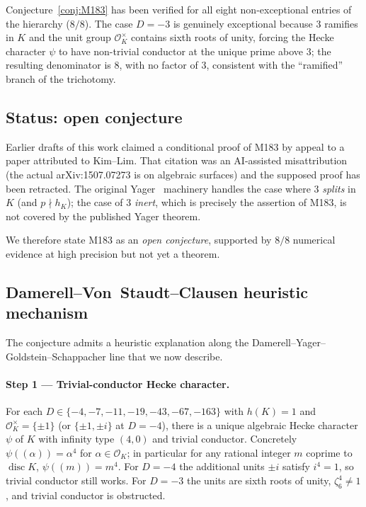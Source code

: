 \documentclass[12pt]{amsart}
\theoremstyle{definition}
\DeclareMathOperator{\disc}{disc}
\newcommand{\OK}{\mathcal{O}_K}
\begin{document}
Conjecture~\ref{conj:M183} has been verified for all eight non-exceptional
entries of the hierarchy ($8/8$). The case $D = -3$ is genuinely
exceptional because $3$ ramifies in $K$ and the unit group $\OK^\times$
contains sixth roots of unity, forcing the Hecke character $\psi$ to
have non-trivial conductor at the unique prime above $3$; the resulting
denominator is $8$, with no factor of $3$, consistent with the
``ramified'' branch of the trichotomy.

\subsection{Status: open conjecture}

Earlier drafts of this work claimed a conditional proof of M183 by
appeal to a paper attributed to Kim--Lim. That citation was an
AI-assisted misattribution (the actual arXiv:1507.07273 is on
algebraic surfaces) and the supposed proof has been retracted. The
original Yager~\cite{Yager1982} machinery handles the case where $3$
\emph{splits} in $K$ (and $p \nmid h_K$); the case of $3$
\emph{inert}, which is precisely the assertion of M183, is not covered
by the published Yager theorem.

We therefore state M183 as an \emph{open conjecture}, supported by
$8/8$ numerical evidence at high precision but not yet a theorem.

\subsection{Damerell--Von~Staudt--Clausen heuristic mechanism}
\label{ssec:M183-heuristic}

The conjecture admits a heuristic explanation along the
Damerell--Yager--Goldstein--Schappacher line that we now describe.

\paragraph{Step 1 — Trivial-conductor Hecke character.}
For each $D \in \{-4,-7,-11,-19,-43,-67,-163\}$ with $h(K) = 1$ and
$\OK^\times = \{\pm 1\}$ (or $\{\pm 1, \pm i\}$ at $D=-4$), there is a
unique algebraic Hecke character $\psi$ of $K$ with infinity type
$(4,0)$ and trivial conductor. Concretely $\psi((\alpha)) = \alpha^4$
for $\alpha \in \OK$; in particular for any rational integer $m$ coprime
to $\disc K$, $\psi((m)) = m^4$. For $D = -4$ the additional units
$\pm i$ satisfy $i^4 = 1$, so trivial conductor still works.
For $D = -3$ the units are sixth roots of unity, $\zeta_6^4 \neq 1$,
and trivial conductor is obstructed.
\end{document}
